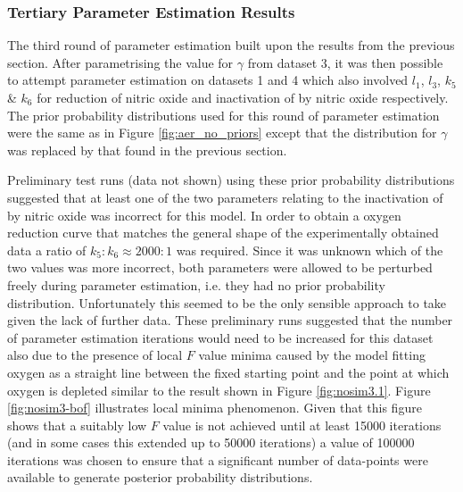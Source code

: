 \subsubsection{Tertiary Parameter Estimation Results}
The third round of parameter estimation built upon the results from the previous section. After parametrising the value for $\gamma$ from dataset 3, it was then possible to attempt parameter estimation on datasets 1 and 4 which also involved $l_1$, $l_3$, $k_5$ \& $k_6$ for reduction of nitric oxide and inactivation of \cbbthree{} by nitric oxide respectively. The prior probability distributions used for this round of parameter estimation were the same as in Figure \ref{fig:aer_no_priors} except that the distribution for $\gamma$ was replaced by that found in the previous section.

Preliminary test runs (data not shown) using these prior probability distributions suggested that at least one of the two parameters relating to the inactivation of \cbbthree{} by nitric oxide was incorrect for this model. In order to obtain a oxygen reduction curve that matches the general shape of the experimentally obtained data a ratio of $k_5:k_6 \approx 2000:1$ was required. Since it was unknown which of the two values was more incorrect, both parameters were allowed to be perturbed freely during parameter estimation, i.e. they had no prior probability distribution. Unfortunately this seemed to be the only sensible approach to take given the lack of further data. These preliminary runs suggested that the number of parameter estimation iterations would need to be increased for this dataset also due to the presence of local $F$ value minima caused by the model fitting oxygen as a straight line between the fixed starting point and the point at which oxygen is depleted similar to the result shown 
in Figure \ref{fig:nosim3.1}. Figure \ref{fig:nosim3-bof} illustrates local minima phenomenon. Given that this figure shows that a suitably low $F$ value is not achieved until at least 15000 iterations (and in some cases this extended up to 50000 iterations) a value of 100000 iterations was chosen to ensure that a significant number of data-points were available to generate posterior probability distributions.


